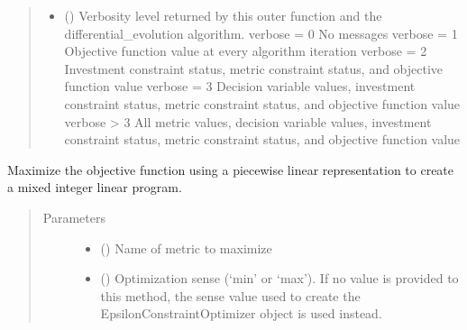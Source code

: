 \documentclass[letterpaper,10pt,english]{sphinxmanual}
\begin{document}
\begin{fulllineitems}
\begin{fulllineitems}
\begin{quote}
\begin{description}
\begin{itemize}
\item {} 
 () \textendash{} Verbosity level returned by this outer function and the
differential\_evolution algorithm.
verbose = 0     No messages
verbose = 1     Objective function value at every algorithm iteration
verbose = 2     Investment constraint status, metric constraint status,
and objective function value
verbose = 3     Decision variable values, investment constraint status,
metric constraint status, and objective function value
verbose \textgreater{} 3     All metric values, decision variable values, investment
constraint status, metric constraint status, and
objective function value

\end{itemize}

\end{description}\end{quote}

\end{fulllineitems}


\begin{fulllineitems}
\label{\detokenize{doc-src/tyche:tyche.EpsilonConstraints.EpsilonConstraintOptimizer.opt_milp}}
Maximize the objective function using a piecewise linear
representation to create a mixed integer linear program.
\begin{quote}\begin{description}
\item[{Parameters}] \leavevmode\begin{itemize}
\item {} 
 () \textendash{} Name of metric to maximize

\item {} 
 () \textendash{} Optimization sense (‘min’ or ‘max’). If no value is provided to this
method, the sense value used to create the EpsilonConstraintOptimizer
object is used instead.


\end{itemize}
\end{description}
\end{quote}
\end{fulllineitems}
\end{fulllineitems}
\end{document}
